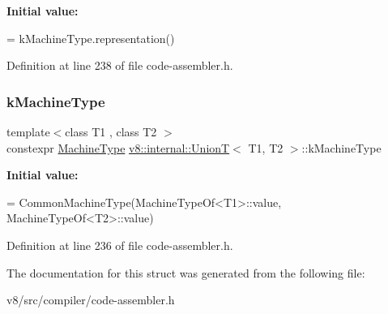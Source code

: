{\bfseries Initial value\+:}
\begin{DoxyCode}
=
      kMachineType.representation()
\end{DoxyCode}


Definition at line 238 of file code-\/assembler.\+h.

\mbox{\label{structv8_1_1internal_1_1UnionT_aa61b80103ec339df5b4b141086e730d1}} 
\subsubsection{\texorpdfstring{k\+Machine\+Type}{kMachineType}}
{\footnotesize\ttfamily template$<$class T1 , class T2 $>$ \\
constexpr \mbox{\hyperlink{classv8_1_1internal_1_1MachineType}{Machine\+Type}} \mbox{\hyperlink{structv8_1_1internal_1_1UnionT}{v8\+::internal\+::\+UnionT}}$<$ T1, T2 $>$\+::k\+Machine\+Type\hspace{0.3cm}{\ttfamily [static]}}

{\bfseries Initial value\+:}
\begin{DoxyCode}
=
      CommonMachineType(MachineTypeOf<T1>::value, MachineTypeOf<T2>::value)
\end{DoxyCode}


Definition at line 236 of file code-\/assembler.\+h.



The documentation for this struct was generated from the following file\+:\begin{DoxyCompactItemize}
\item 
v8/src/compiler/code-\/assembler.\+h\end{DoxyCompactItemize}
